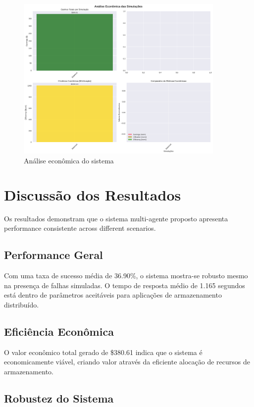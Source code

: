 \documentclass[12pt,a4paper]{article}
\begin{document}
\begin{figure}[H]
    \centering
    \includegraphics[width=0.9\textwidth]{economic_analysis.png}
    \caption{Análise econômica do sistema}
    \label{fig:economics}
\end{figure}

\section{Discussão dos Resultados}


Os resultados demonstram que o sistema multi-agente proposto apresenta performance consistente across different scenarios. 

\subsection{Performance Geral}

Com uma taxa de sucesso média de 36.90\%, o sistema mostra-se robusto mesmo na presença de falhas simuladas. O tempo de resposta médio de 1.165 segundos está dentro de parâmetros aceitáveis para aplicações de armazenamento distribuído.

\subsection{Eficiência Econômica}

O valor econômico total gerado de \$380.61 indica que o sistema é economicamente viável, criando valor através da eficiente alocação de recursos de armazenamento.

\subsection{Robustez do Sistema}
\end{document}
